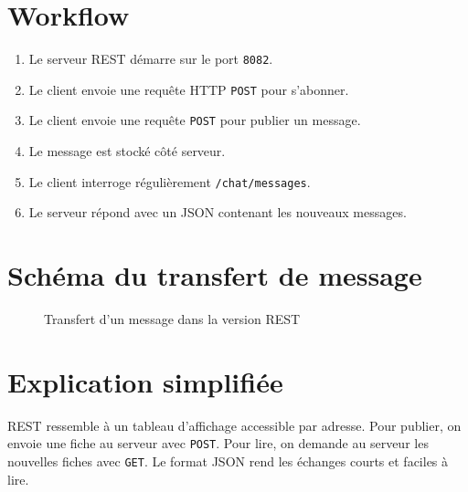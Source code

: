 \documentclass[12pt,a4paper]{report}
\begin{document}
\section{Workflow}

\begin{enumerate}
    \item Le serveur REST démarre sur le port \texttt{8082}.
    \item Le client envoie une requête HTTP \texttt{POST} pour s'abonner.
    \item Le client envoie une requête \texttt{POST} pour publier un message.
    \item Le message est stocké côté serveur.
    \item Le client interroge régulièrement \texttt{/chat/messages}.
    \item Le serveur répond avec un JSON contenant les nouveaux messages.
\end{enumerate}

\section{Schéma du transfert de message}

\begin{figure}[H]
\centering
{}
\caption{Transfert d'un message dans la version REST}
\end{figure}

\section{Explication simplifiée}

REST ressemble à un tableau d'affichage accessible par adresse. Pour publier, on envoie une fiche au serveur avec \texttt{POST}. Pour lire, on demande au serveur les nouvelles fiches avec \texttt{GET}. Le format JSON rend les échanges courts et faciles à lire.
\end{document}
